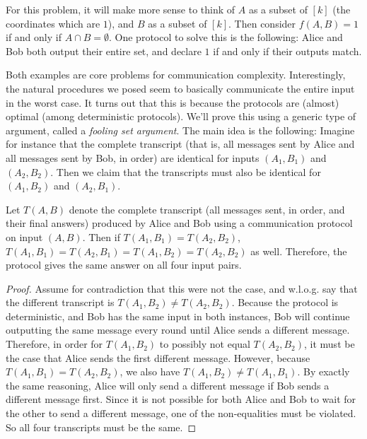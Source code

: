 \begin{Exa}[Disjointness] For this problem, it will make more sense to think of $A$ as a subset of $[k]$ (the coordinates which are $1$), and $B$ as a subset of $[k]$. Then consider $f(A, B) = 1$ if and only if $A \cap B = \emptyset$. One protocol to solve this is the following: Alice and Bob both output their entire set, and declare $1$ if and only if their outputs match.\end{Exa}

Both examples are core problems for communication complexity. Interestingly, the natural procedures we posed seem to basically communicate the entire input in the worst case. It turns out that this is because the protocols are (almost) optimal (among deterministic protocols). We'll prove this using a generic type of argument, called a \emph{fooling set argument}. The main idea is the following: Imagine for instance that the complete transcript (that is, all messages sent by Alice and all messages sent by Bob, in order) are identical for inputs $(A_1, B_1)$ and $(A_2, B_2)$. Then we claim that the transcripts must also be identical for $(A_1, B_2)$ and $(A_2, B_1)$.

\begin{observation}[Rectangles] Let $T(A, B)$ denote the complete transcript (all messages sent, in order, and their final answers) produced by Alice and Bob using a communication protocol on input $(A, B)$. Then if $T(A_1, B_1) = T(A_2, B_2)$, $T(A_1, B_1) = T(A_2, B_1) = T(A_1, B_2) = T(A_2, B_2)$ as well. Therefore, the protocol gives the same answer on all four input pairs.
\end{observation}
\begin{proof}
Assume for contradiction that this were not the case, and w.l.o.g. say that the different transcript is $T(A_1, B_2) \neq T(A_2, B_2)$. Because the protocol is deterministic, and Bob has the same input in both instances, Bob will continue outputting the same message every round until Alice sends a different message. Therefore, in order for $T(A_1, B_2)$ to possibly not equal $T(A_2, B_2)$, it must be the case that Alice sends the first different message. However, because $T(A_1, B_1) = T(A_2, B_2)$, we also have $T(A_1, B_2) \neq T(A_1, B_1)$. By exactly the same reasoning, Alice will only send a different message if Bob sends a different message first. Since it is not possible for both Alice and Bob to wait for the other to send a different message, one of the non-equalities must be violated. So all four transcripts must be the same.
\end{proof}

